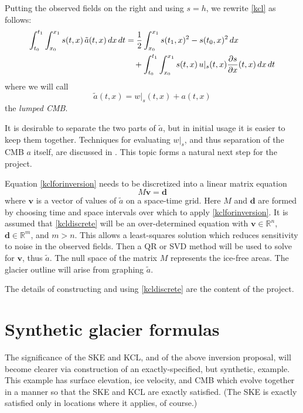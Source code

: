 \documentclass[letterpaper,final,12pt,reqno]{amsart}
\newcommand{\RR}{\mathbb{R}}
\newcommand{\bd}{\mathbf{d}}
\newcommand{\bv}{\mathbf{v}}
\begin{document}
Putting the observed fields on the right and using $s=h$, we rewrite \eqref{kcl} as follows:
\begin{align}
\int_{t_0}^{t_1} \int_{x_0}^{x_1} s(t,x)\, \tilde a(t,x) \,dx\,dt &= \frac{1}{2} \int_{x_0}^{x_1} s(t_1,x)^2 - s(t_0,x)^2\,dx  \label{kclforinversion} \\
    &\quad + \int_{t_0}^{t_1} \int_{x_0}^{x_1} s(t,x)\, u|_s(t,x) \frac{\partial s}{\partial x}(t,x) \,dx\,dt \notag
\end{align}
where we will call
\begin{equation}
\tilde a(t,x) = w|_s(t,x) + a(t,x) \label{surfacerate}
\end{equation}
the \emph{lumped CMB}.

It is desirable to separate the two parts of $\tilde a$, but in initial usage it is easier to keep them together.  Techniques for evaluating $w|_s$, and thus separation of the CMB $a$ itself, are discussed in \cite{GudmundssonBauder1999}.  This topic forms a natural next step for the project.

Equation \eqref{kclforinversion} needs to be discretized into a linear matrix equation
\begin{equation}
M \bv = \bd \label{kcldiscrete}
\end{equation}
where $\bv$ is a vector of values of $\tilde a$ on a space-time grid.  Here $M$ and $\bd$ are formed by choosing time and space intervals over which to apply \eqref{kclforinversion}.  It is assumed that \eqref{kcldiscrete} will be an over-determined equation with $\bv\in\RR^n$, $\bd\in\RR^m$, and $m>n$.  This allows a least-squares solution which reduces sensitivity to noise in the observed fields.  Then a QR or SVD method will be used to solve for $\bv$, thus $\tilde a$.  The null space of the matrix $M$ represents the ice-free areas.  The glacier outline will arise from graphing $\tilde a$.

The details of constructing and using \eqref{kcldiscrete} are the content of the project.


\section{Synthetic glacier formulas}

The significance of the SKE and KCL, and of the above inversion proposal, will become clearer via construction of an exactly-specified, but synthetic, example.  This example has surface elevation, ice velocity, and CMB which evolve together in a manner so that the SKE and KCL are exactly satisfied.  (The SKE is exactly satisfied only in locations where it applies, of course.)
\end{document}

